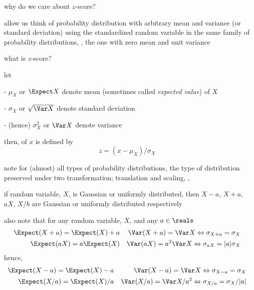\documentclass[17pt,landscape]{foils}
\begin{document}
{\vfill



\bit
	\item why do we care about $z$-score?
	\bit
		\item allow us think of probability distribution with arbitrary mean and variance (or standard deviation)
			using the standardized random variable
			in the same family of probability distributions,
			\ie,
			the one with zero mean and unit variance
	\eit

	\vitem what is $z$-score?
	\bit
		\item let
		\bit
			\item [-] $\mu_X$ or $\Expect X$ denote mean (sometimes called \emph{expected value}) of $X$%
			\item [-] $\sigma_X$ or $\sqrt{\Var X}$ denote standard deviation%
			\item [-] (hence) $\sigma_X^2$ or ${\Var X}$ denote variance%
		\eit

		\vitem then,  of $x$ is defined by
		\[
			z = (x-\mu_X) / \sigma_X
		\]
	\eit
\eit


%

\bit
	\item note for (almost) all types of probability distributions,
		the type of distribution preserved under two transformation; translation and scaling, \eg,

	\bit
		\item if random variable, $X$, is Gaussian or uniformly distributed,%
			then $X-a$, $X+a$, $aX$, $X/b$ are Gaussian or uniformly distributed respectively
	\eit

	\vitem also note that for any random variable, $X$, and any $a\in\reals$
	\begin{eqnarray*}
		\Expect (X+a) = \Expect (X) + a && \Var(X+a) = \Var X \Leftrightarrow \sigma_{X+a} = \sigma_X
		\\
		\Expect (aX) = a\Expect (X)&& \Var(aX) = a^2\Var X \Leftrightarrow \sigma_{aX} = |a|\sigma_X
	\end{eqnarray*}
	hence,
	\begin{eqnarray*}
		\Expect (X-a) = \Expect (X) - a && \Var(X-a) = \Var X \Leftrightarrow \sigma_{X-a} = \sigma_X
		\\
		\Expect (X/a) = \Expect (X)/a&& \Var(X/a) = \Var X/a^2 \Leftrightarrow \sigma_{X/a} = \sigma_X / |a|
	\end{eqnarray*}
\eit


}
\end{document}

